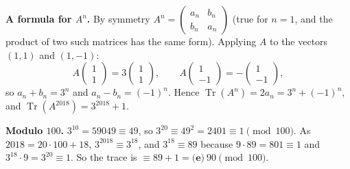 \textbf{A formula for $A^n$.} By symmetry $A^n=\begin{pmatrix}a_n&b_n\\b_n&a_n\end{pmatrix}$ (true for $n=1$, and the product of two such matrices has the same form). Applying $A$ to the vectors $(1,1)$ and $(1,-1)$:
\[
A\begin{pmatrix}1\\1\end{pmatrix}=3\begin{pmatrix}1\\1\end{pmatrix},\qquad A\begin{pmatrix}1\\-1\end{pmatrix}=-\begin{pmatrix}1\\-1\end{pmatrix},
\]
so $a_n+b_n=3^n$ and $a_n-b_n=(-1)^n$. Hence $\operatorname{Tr}\left(A^n\right)=2a_n=3^n+(-1)^n$, and $\operatorname{Tr}\left(A^{2018}\right)=3^{2018}+1$.

\textbf{Modulo $100$.} $3^{10}=59049\equiv49$, so $3^{20}\equiv49^2=2401\equiv1\pmod{100}$. As $2018=20\cdot100+18$, $3^{2018}\equiv3^{18}$, and $3^{18}\equiv89$ because $9\cdot89=801\equiv1$ and $3^{18}\cdot9=3^{20}\equiv1$. So the trace is $\equiv89+1=\boxed{\textbf{(e)}\ 90}\pmod{100}$.
